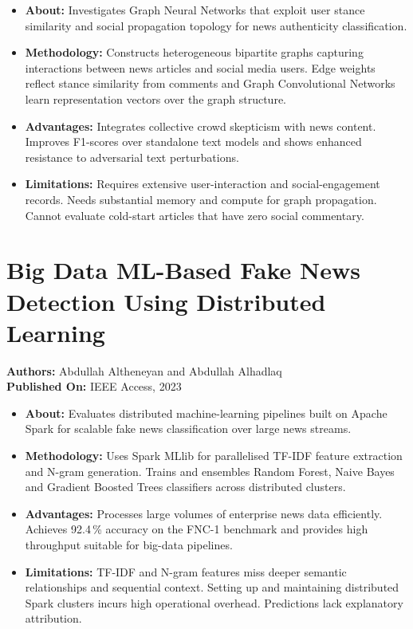 \documentclass[12pt,a4paper,oneside]{report}
\begin{document}
\begin{itemize}[leftmargin=*, itemsep=2pt]
  \item \textbf{About:} Investigates Graph Neural Networks that exploit user stance
        similarity and social propagation topology for news authenticity classification.
  \item \textbf{Methodology:} Constructs heterogeneous bipartite graphs capturing
        interactions between news articles and social media users. Edge weights reflect
        stance similarity from comments and Graph Convolutional Networks learn
        representation vectors over the graph structure.
  \item \textbf{Advantages:} Integrates collective crowd skepticism with news content.
        Improves F1-scores over standalone text models and shows enhanced resistance to
        adversarial text perturbations.
  \item \textbf{Limitations:} Requires extensive user-interaction and social-engagement
        records. Needs substantial memory and compute for graph propagation. Cannot
        evaluate cold-start articles that have zero social commentary.
\end{itemize}

\section{Big Data ML-Based Fake News Detection Using Distributed Learning}
\textbf{Authors:} Abdullah Altheneyan and Abdullah Alhadlaq\\
\textbf{Published On:} IEEE Access, 2023

\begin{itemize}[leftmargin=*, itemsep=2pt]
  \item \textbf{About:} Evaluates distributed machine-learning pipelines built on Apache
        Spark for scalable fake news classification over large news streams.
  \item \textbf{Methodology:} Uses Spark MLlib for parallelised TF-IDF feature
        extraction and N-gram generation. Trains and ensembles Random Forest, Naive
        Bayes and Gradient Boosted Trees classifiers across distributed clusters.
  \item \textbf{Advantages:} Processes large volumes of enterprise news data efficiently.
        Achieves 92.4\,\% accuracy on the FNC-1 benchmark and provides high throughput
        suitable for big-data pipelines.
  \item \textbf{Limitations:} TF-IDF and N-gram features miss deeper semantic
        relationships and sequential context. Setting up and maintaining distributed
        Spark clusters incurs high operational overhead. Predictions lack explanatory
        attribution.
\end{itemize}
\end{document}
